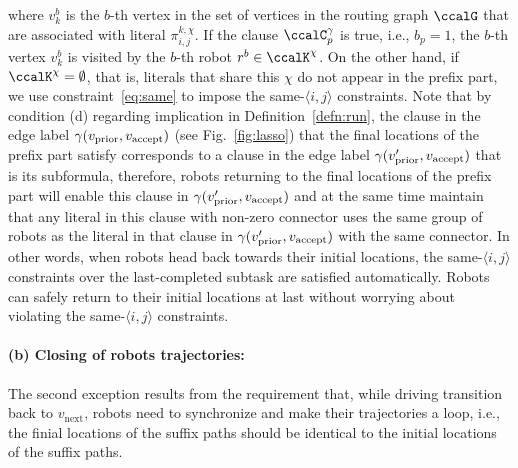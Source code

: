 \documentclass[Afour,sageh,times]{sagej}
\newcommand{\auto}[1]{\ccalA_{\textup{#1}}}
\newcommand{\vertex}[1]{v_{\textup{#1}}}
\newcommand{\ag}[2]{\langle#1,#2\rangle}
\renewcommand{\ap}[3]{\mathcal{\pi}_{{#1},{#2}}^{#3}}
\begin{document}
{where $v_k^b$ is the $b$-th vertex in the set of vertices in the routing graph $\ccalG$  that are associated with literal $\ap{i}{j}{k,\chi}$. If the clause $\ccalC_p^\gamma$ is true, i.e.,  $b_p=1$, the $b$-th vertex $v_k^b$ is visited by the $b$-th robot $r^b \in \ccalK^\chi$. On the other hand, if $\ccalK^\chi = \emptyset$, that is, literals that share this $\chi$ do not appear in the prefix part, we use constraint~\eqref{eq:same} to impose the same-$\ag{i}{j}$ constraints. Note that by condition (d) regarding implication in Definition~\ref{defn:run}, the clause in the edge label $\gamma(\vertex{prior}, \vertex{accept})$ (see Fig.~\ref{fig:lasso}) that the final locations of the prefix part satisfy corresponds to a clause in the edge label $\gamma(\vertex{prior}', \vertex{accept})$ that is its subformula, therefore, robots returning to the final locations of the prefix part will enable this clause in $\gamma(\vertex{prior}', \vertex{accept})$ and at the same time maintain that any literal in this clause with non-zero connector uses the same group of robots as the literal in that clause in $\gamma(\vertex{prior}', \vertex{accept})$ with the same connector.  In other words, when robots head back towards their initial locations, the same-$\ag{i}{j}$ constraints over the last-completed subtask are satisfied automatically. Robots can safely return to their initial locations at last without worrying about violating the same-$\ag{i}{j}$ constraints.

\paragraph{\quad (b) Closing of robots trajectories:} The second exception results from the requirement that, while driving transition back to $v_{\text{next}}$, robots need to synchronize and make their trajectories a loop, i.e., the finial locations of the suffix paths should be identical to the initial locations of the suffix paths.

}
\end{document}
